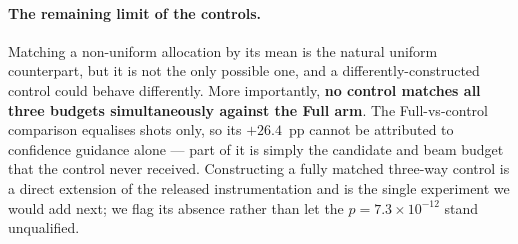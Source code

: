 \documentclass[preprint,11pt]{elsarticle}
\begin{document}
\paragraph{The remaining limit of the controls.} Matching a non-uniform
allocation by its mean is the natural uniform counterpart, but it is not
the only possible one, and a differently-constructed control could
behave differently. More importantly, \textbf{no control matches all
three budgets simultaneously against the Full arm}. The
Full-vs-control comparison equalises shots only, so its $+26.4$~pp
cannot be attributed to confidence guidance alone --- part of it is
simply the candidate and beam budget that the control never received.
Constructing a fully matched three-way control is a direct extension of
the released instrumentation and is the single experiment we would add
next; we flag its absence rather than let the $p=7.3\times10^{-12}$
stand unqualified.

\begin{table}[htbp]
\centering\small
\caption{Matched-resource controls on the canonical 144-trial grid. Each
control runs the Baseline code path, with all module flags disabled, at
the uniform budget derived from that trial's own adaptive diagnostics.
$b$ = trials where the control succeeded and the adaptive arm failed;
$c$ = the reverse. The upper block is the reference gain over an
unmodified baseline; the lower block is the comparison that matters.}
\label{tab:matched}
\end{table}
\end{document}
